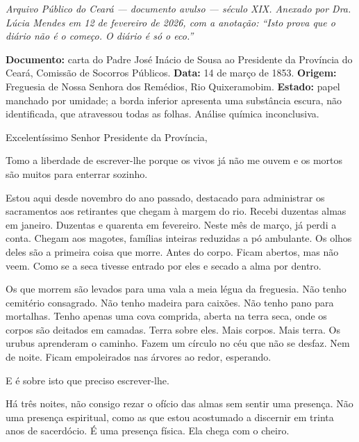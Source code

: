 
\noindent \textit{Arquivo Público do Ceará --- documento avulso --- século XIX. Anexado por Dra. Lúcia Mendes em 12 de fevereiro de 2026, com a anotação: ``Isto prova que o diário não é o começo. O diário é só o eco.''}

\noindent \textbf{Documento:} carta do Padre José Inácio de Sousa ao Presidente da Província do Ceará, Comissão de Socorros Públicos. \textbf{Data:} 14 de março de 1853. \textbf{Origem:} Freguesia de Nossa Senhora dos Remédios, Rio Quixeramobim. \textbf{Estado:} papel manchado por umidade; a borda inferior apresenta uma substância escura, não identificada, que atravessou todas as folhas. Análise química inconclusiva.

\vspace{0.5em}
\noindent Excelentíssimo Senhor Presidente da Província,

\noindent Tomo a liberdade de escrever-lhe porque os vivos já não me ouvem e os mortos são muitos para enterrar sozinho.

\noindent Estou aqui desde novembro do ano passado, destacado para administrar os sacramentos aos retirantes que chegam à margem do rio. Recebi duzentas almas em janeiro. Duzentas e quarenta em fevereiro. Neste mês de março, já perdi a conta. Chegam aos magotes, famílias inteiras reduzidas a pó ambulante. Os olhos deles são a primeira coisa que morre. Antes do corpo. Ficam abertos, mas não veem. Como se a seca tivesse entrado por eles e secado a alma por dentro.

\noindent Os que morrem são levados para uma vala a meia légua da freguesia. Não tenho cemitério consagrado. Não tenho madeira para caixões. Não tenho pano para mortalhas. Tenho apenas uma cova comprida, aberta na terra seca, onde os corpos são deitados em camadas. Terra sobre eles. Mais corpos. Mais terra. Os urubus aprenderam o caminho. Fazem um círculo no céu que não se desfaz. Nem de noite. Ficam empoleirados nas árvores ao redor, esperando.

\noindent E é sobre isto que preciso escrever-lhe.

\noindent Há três noites, não consigo rezar o ofício das almas sem sentir uma presença. Não uma presença espiritual, como as que estou acostumado a discernir em trinta anos de sacerdócio. É uma presença física. Ela chega com o cheiro.

